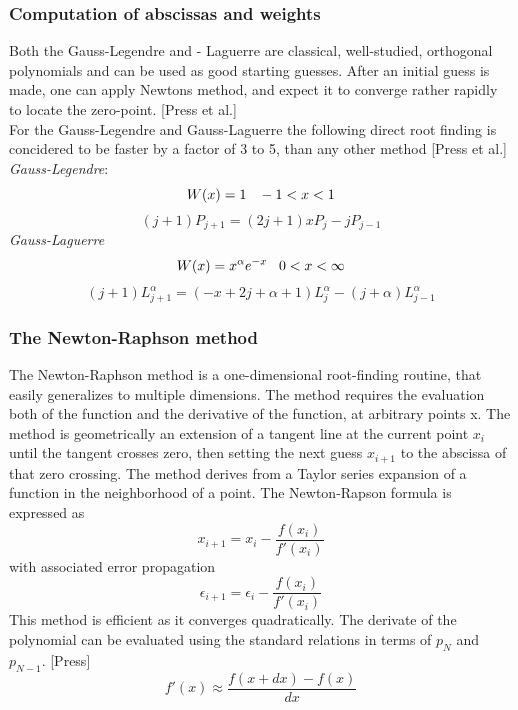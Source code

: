 \documentclass[%
reprint,
amsmath,amssymb,
aps,
]{revtex4-1}
\begin{document}
\subsubsection{Computation of abscissas and weights}
Both the Gauss-Legendre and - Laguerre are classical, well-studied, orthogonal polynomials and can be used as good starting guesses. After an initial guess is made, one can apply Newtons method, and expect  it to converge rather rapidly to locate the zero-point. [Press et al.] \\
For the Gauss-Legendre and Gauss-Laguerre the following direct root finding is concidered to be faster by a factor of 3 to 5, than any other method [Press et al.]\\
\textit{Gauss-Legendre}:
\begin{equation*}
	W(x) = 1 \hspace{3mm} -1 < x < 1 
\end{equation*}
\begin{equation}\label{glegfunc}
	(j+1)P_{j+1} = (2j +1)xP_j - jP_{j-1}
\end{equation}
\textit{Gauss-Laguerre}
\begin{equation*}
W(x) = x^\alpha e^{-x} \hspace{3mm} 0 < x < \infty 
\end{equation*}
\begin{equation}
(j+1)L_{j+1}^\alpha = (-x+2j+\alpha+1)L_j^\alpha -(j+\alpha)L_{j-1}^\alpha
\end{equation}
\subsubsection{The Newton-Raphson method} \noindent 
The Newton-Raphson method is a one-dimensional root-finding routine, that easily generalizes to multiple dimensions. The method requires the evaluation both of the function and the derivative of the function, at arbitrary points x. The method is geometrically an extension of a tangent line at the current point $x_i$ until the tangent crosses zero, then setting the next guess $x_{i+1}$ to the abscissa of that zero crossing. The method derives from a Taylor series expansion of a function in the neighborhood of a point. The Newton-Rapson formula is expressed as
\begin{equation}
	x_{i+1} = x_i -\dfrac{f(x_i)}{f'(x_i)}
\end{equation}
with associated error propagation
\begin{equation}
	\epsilon_{i+1} = \epsilon_i  -\dfrac{f(x_i)}{f'(x_i)}
\end{equation}
This method is efficient as it converges quadratically. The derivate of the polynomial can be evaluated using the standard relations in terms of $p_N$ and $p_{N-1}$.  [Press]
\begin{equation}
	f'(x) \approx \dfrac{f(x+dx)- f(x)}{dx}
\end{equation}
\end{document}
